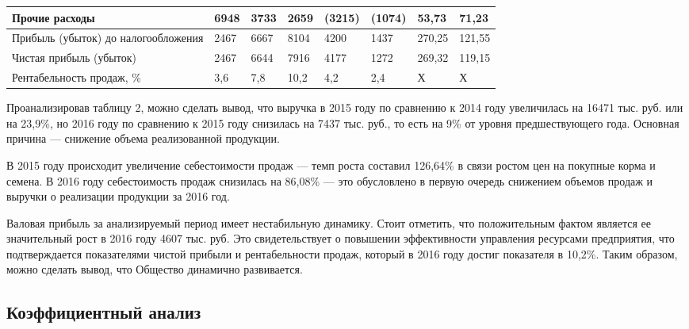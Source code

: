 \begin{table}[!hb]
\begin{tabularx}{\textwidth}{|p{4.3cm}|K{1cm}|K{1cm}|K{1cm}|K{1.5cm}|K{1.5cm}|K{1.6cm}|K{1.6cm}|}
		Прочие расходы                      & 6948                      & 3733                      & 2659                      & (3215)               & (1074)               & 53,73                 & 71,23                 \\ \hline
		Прибыль (убыток) до налогообложения & 2467                      & 6667                      & 8104                      & 4200                & 1437                & 270,25              & 121,55                \\ \hline
		Чистая прибыль (убыток)             & 2467                      & 6644                      & 7916                      & 4177                & 1272                & 269,32              & 119,15                \\ \hline
		Рентабельность продаж, \%           & 3,6                       & 7,8                       & 10,2                      & 4,2                 & 2,4                 & Х                     & Х                     \\ \hline
	\end{tabularx}
\end{table}

Проанализировав таблицу 2, можно сделать вывод, что выручка в 2015 году по сравнению к 2014 году увеличилась на 16471 тыс. руб. или на 23,9\%, но 2016
году по сравнению к 2015 году снизилась на 7437 тыс. руб., то есть на 9\% от уровня предшествующего года. Основная причина — снижение объема реализованной продукции.

В 2015 году происходит увеличение себестоимости продаж — темп роста составил 126,64\% в связи ростом цен на покупные корма и семена. В 2016 году себестоимость продаж снизилась на 86,08\% — это обусловлено в первую очередь снижением объемов продаж и выручки о реализации продукции за 2016 год.

Валовая прибыль за анализируемый период имеет нестабильную динамику. Стоит отметить, что положительным фактом является ее значительный рост в 2016 году 4607 тыс. руб. Это свидетельствует о повышении эффективности управления ресурсами предприятия, что подтверждается показателями чистой прибыли и рентабельности продаж, который в 2016 году достиг показателя в 10,2\%. Таким образом, можно сделать вывод, что Общество динамично развивается.

\subsection{Коэффициентный анализ}

